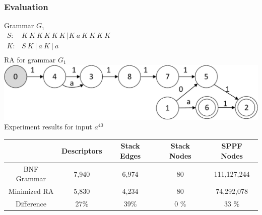 \documentclass{beamer}
\begin{document}
	\begin{frame} 
		\frametitle{Evaluation}
		\begin{center}
		\vspace{-10pt}
		Grammar $G_1$\\
		\vspace{6pt}
		$
		\begin{array}{rl}
		S :& K\ K\ K\ K\ K\ K \ | K\ a\ K\ K\ K\ K \\
		K :& S\ K\ |\ a\ K\ |\ a \\
		\end{array}
		$
		\\
		\vspace{15pt}
		RA for grammar $G_1$
		\\
		\vspace{6pt}
		\includegraphics[scale=.5]{pictures/G1automaton.pdf}
		\\
		\vspace{7pt}
		Experiment results for input $a^{40}$
		\\
		\vspace{2pt}
		\begin{tabular}{ | c | c | c | c | c | }
			\hline
             &  Descriptors & Stack Edges & Stack Nodes & SPPF Nodes   \\ \hline
			BNF Grammar  &  7,940        & 6,974      & 80        & 111,127,244  \\ \hline
			Minimized RA &  5,830        & 4,234      & 80        & 74,292,078  \\ \hline \hline
			Difference   &  27$\%$       & 39$\%$     & 0 $\%$    &  33 $\%$ \\ \hline
		\end{tabular}
		\end{center}
	\end{frame}
	
\end{document}
